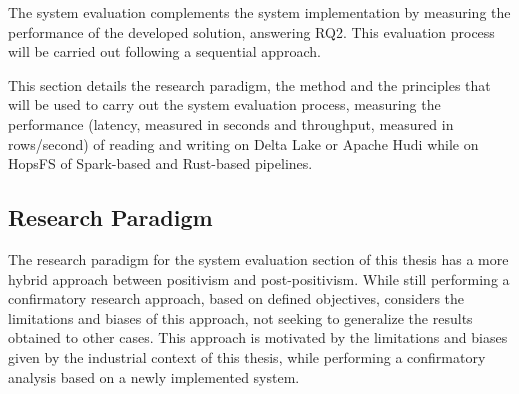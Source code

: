 The system evaluation complements the system implementation by measuring the performance of the developed solution, answering RQ2. This evaluation process will be carried out following a sequential approach.

This section details the research paradigm, the method and the principles that will be used to carry out the system evaluation process, measuring the performance (latency, measured in seconds and throughput, measured in rows/second) of reading and writing on Delta Lake or Apache Hudi while on \gls{HopsFS} of Spark-based and Rust-based pipelines. 

\subsection{Research Paradigm}
The research paradigm for the system evaluation section of this thesis has a more hybrid approach between positivism and post-positivism. While still performing a confirmatory research approach, based on defined objectives, considers the limitations and biases of this approach, not seeking to generalize the results obtained to other cases. This approach is motivated by the limitations and biases given by the industrial context of this thesis, while performing a confirmatory analysis based on a newly implemented system.

